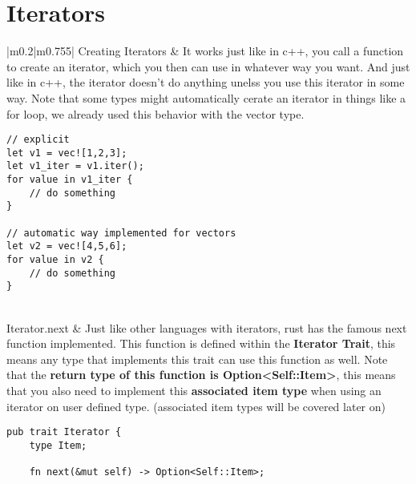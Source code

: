 \documentclass[main.tex,fontsize=8pt,paper=a4,paper=portrait,DIV=calc,]{scrartcl}
\begin{document}
\begin{table}[ht!]
\section{Iterators}
\begin{tabular}{|m{0.2\linewidth}|m{0.755\linewidth}|}
\hline
Creating Iterators & 
It works just like in c++, you call a function to create an iterator, which you then can use in whatever way you want. \newline
And just like in c++, the iterator doesn't do anything unelss you use this iterator in some way.\newline
Note that some types might automatically cerate an iterator in things like a for loop, we already used this behavior with the vector type.\newline
\begin{lstlisting}
// explicit
let v1 = vec![1,2,3];
let v1_iter = v1.iter();
for value in v1_iter {
    // do something
}

// automatic way implemented for vectors
let v2 = vec![4,5,6];
for value in v2 {
    // do something
}
\end{lstlisting}\\
\hline
Iterator.next & 
Just like other languages with iterators, rust has the famous next function implemented. \newline
This function is defined within the \textbf{Iterator Trait}, this means any type that implements this trait can use this function as well.\newline
Note that the \textbf{return type of this function is Option<Self::Item>}, this means that you also need to implement this \textbf{associated item type} when using an iterator on user defined type.\newline
(associated item types will be covered later on)\newline
\begin{lstlisting}
pub trait Iterator {
    type Item;

    fn next(&mut self) -> Option<Self::Item>;


\end{lstlisting}
\end{tabular}
\end{table}
\end{document}
